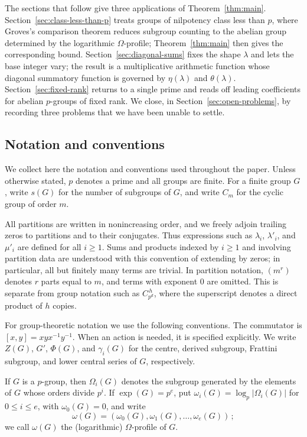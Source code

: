 \documentclass[a4paper,11pt,reqno]{amsart}
\theoremstyle{plain}
\theoremstyle{remark}
\numberwithin{equation}{section}
\renewcommand{\leq}{\leqslant}
\renewcommand{\geq}{\geqslant}
\begin{document}
The sections that follow give three applications of Theorem~\ref{thm:main}.
Section~\ref{sec:class-less-than-p} treats groups of nilpotency class less
than $p$, where Groves's comparison theorem reduces subgroup counting to the
abelian group determined by the logarithmic $\Omega$-profile;
Theorem~\ref{thm:main} then gives the corresponding bound.
Section~\ref{sec:diagonal-sums} fixes the shape $\lambda$ and lets the base
integer vary; the result is a multiplicative arithmetic function whose diagonal 
summatory function is governed by $\eta(\lambda)$ and $\theta(\lambda)$. 
Section~\ref{sec:fixed-rank} returns to a single prime and reads off leading
coefficients for abelian $p$-groups of fixed rank.
We close, in Section~\ref{sec:open-problems}, by recording three problems 
that we have been unable to settle.

\subsection{Notation and conventions}
\label{subsec:notation}

We collect here the notation and conventions used throughout the paper. Unless
otherwise stated, $p$ denotes a prime and all groups are finite. 
For a finite group $G$, write $s(G)$ for the number of subgroups of $G$, 
and write $C_m$ for the cyclic group of order $m$.

All partitions are written in nonincreasing order, and we freely adjoin trailing
zeros to partitions and to their conjugates. Thus expressions such as
$\lambda_i$, $\lambda'_i$, and $\mu'_i$ are defined for all $i\geq 1$.
Sums and products indexed by $i\geq 1$ and involving partition data are
understood with this convention of extending by zeros; in particular, all but
finitely many terms are trivial. In partition notation, $(m^r)$ denotes
$r$ parts equal to $m$, and terms with exponent $0$ are omitted. This is
separate from group notation such as $C_{p^d}^{\,h}$, where the superscript
denotes a direct product of $h$ copies.

For group-theoretic notation we use the following conventions.
The commutator is $[x,y]=xyx^{-1}y^{-1}$. When an action is needed, it is
specified explicitly. We write $Z(G)$, $G'$, $\Phi(G)$, and $\gamma_i(G)$
for the centre, derived subgroup, Frattini subgroup, and lower central series
of $G$, respectively.

If $G$ is a $p$-group, then
$\Omega_i(G)$ denotes the subgroup generated by the elements of $G$ whose
orders divide $p^i$. 
If $\exp(G)=p^e$, put
$\omega_i(G)=\log_p|\Omega_i(G)|$ for $0\leq i\leq e$, with
$\omega_0(G)=0$, and write
\[
\omega(G)=(\omega_0(G),\omega_1(G),\ldots,\omega_e(G))\,;
\]
we call $\omega(G)$ the (logarithmic) $\Omega$-profile of $G$.
\end{document}
